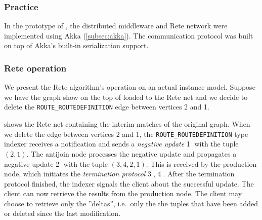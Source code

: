 \subsubsection{Practice}

In the prototype of \iqd{}, the distributed middleware and Rete network were implemented using Akka (\autoref{subsec:akka}). The communication protocol was built on top of Akka's built-in serialization support.


\subsubsection{Rete operation}

We present the Rete algorithm's operation on an actual instance model. Suppose we have the graph show on the top of  loaded to the Rete net and we decide to delete the \texttt{ROUTE\_ROUTEDEFINITION} edge between vertices 2 and 1. 


 shows the Rete net containing the interim matches of the original graph. When we delete the edge between vertices 2 and 1, the \texttt{ROUTE\_ROUTEDEFINITION} type indexer receives a notification and sends a \textit{negative update} \textcircled{1} with the tuple $(2, 1)$. The antijoin node processes the negative update and propagates a negative update \textcircled{2} with the tuple $(3, 4, 2, 1)$. This is received by the production node, which initiates the \textit{termination protocol} \textcircled{3}, \textcircled{4}. After the termination protocol finished, the indexer signals the client about the successful update. The client can now retrieve the results from the production node. The client may choose to retrieve only the ''deltas'', i.e.\ only the the tuples that have been added or deleted since the last modification.


